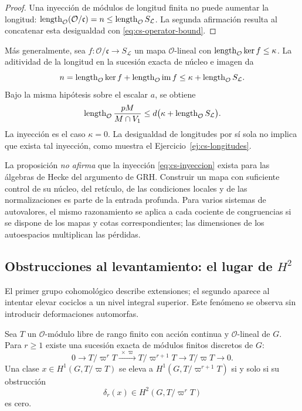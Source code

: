 \begin{proof}
Una inyección de módulos de longitud finita no
puede aumentar la longitud:
$\operatorname{length}_{\mathcal O}(\mathcal O/\mathfrak c)
=n\le\operatorname{length}_{\mathcal O}S_\mathcal L$.
La segunda afirmación resulta al concatenar esta
desigualdad con \eqref{eq:cs-operator-bound}.
\end{proof}

Más generalmente, sea $f:\mathcal O/\mathfrak c\to S_\mathcal L$
un mapa $\mathcal O$-lineal con
$\operatorname{length}_{\mathcal O}\ker f\le\kappa$. La aditividad de la
longitud en la sucesión exacta de núcleo e imagen da
\[
 n=\operatorname{length}_{\mathcal O}\ker f+
   \operatorname{length}_{\mathcal O}\operatorname{im}f
 \le\kappa+\operatorname{length}_{\mathcal O}S_\mathcal L.
\]
Bajo la misma hipótesis sobre el escalar $a$, se obtiene
\[
 \operatorname{length}_{\mathcal O}\frac{pM}{M\cap V_1}
 \le d\bigl(\kappa+\operatorname{length}_{\mathcal O}S_\mathcal L\bigr).
\]
La inyección es el caso $\kappa=0$. La desigualdad de
longitudes por sí sola no implica que exista tal inyección,
como muestra el Ejercicio~\ref{ej:cs-longitudes}.

La proposición \emph{no afirma} que la inyección
\eqref{eq:cs-inyeccion} exista para las álgebras de Hecke
del argumento de GRH. Construir un mapa con suficiente
control de su núcleo, del retículo, de las condiciones locales
y de las normalizaciones es parte de la entrada profunda.
Para varios sistemas de autovalores, el mismo razonamiento
se aplica a cada cociente de congruencias si se dispone
de los mapas y cotas correspondientes; las dimensiones
de los autoespacios multiplican las pérdidas.

\subsection{Obstrucciones al levantamiento: el lugar de \texorpdfstring{$H^2$}{H2}}

El primer grupo cohomológico describe extensiones;
el segundo aparece al intentar elevar cociclos a un nivel
integral superior. Este fenómeno se observa sin introducir
deformaciones automorfas.

\begin{proposicion}
\label{prop:cs-bockstein}
Sea $T$ un $\mathcal O$-módulo libre de rango finito
con acción continua y $\mathcal O$-lineal de $G$.
Para $r\ge1$ existe una sucesión exacta de módulos
finitos discretos de $G$:
\begin{equation}
 0\longrightarrow T/\varpi^r T
 \xrightarrow{\ \times\varpi\ }
 T/\varpi^{r+1}T
 \longrightarrow T/\varpi T\longrightarrow0.
 \label{eq:cs-exacta-bockstein}
\end{equation}
Una clase $x\in H^1(G,T/\varpi T)$ se eleva a
$H^1(G,T/\varpi^{r+1}T)$ si y solo si su obstrucción
\begin{equation}
 \delta_r(x)\in H^2(G,T/\varpi^rT)
 \label{eq:cs-bockstein}
\end{equation}
es cero.
\end{proposicion}

